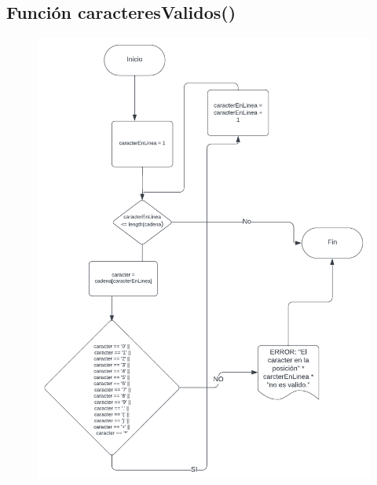 \documentclass{article}
\begin{document}
\subsection{Función caracteresValidos()}
\begin{figure}[h] 
	\centering 	\includegraphics[width=0.9\linewidth]{Función caracteresValidos.png}
	\label{fig:Gráfica 3}
\end{figure}

\pagebreak
\end{document}
